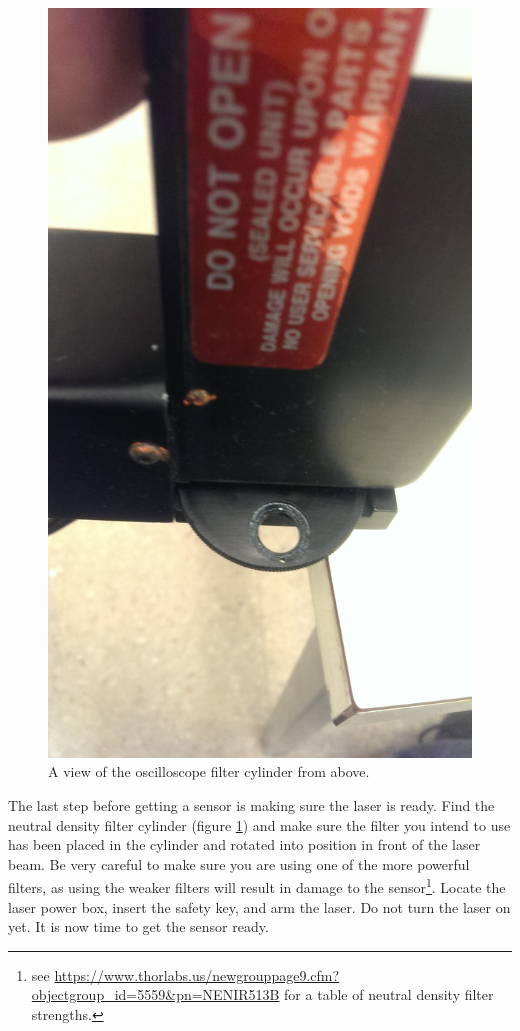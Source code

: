 \documentclass{report}
\begin{document}
            \begin{figure}[h] 
                \includegraphics[height=.4\textheight]{laser_00}
                \centering
                \caption{ A view of the oscilloscope filter cylinder from above. }
                \label{fig:laser_00}
            \end{figure}

            The last step before getting a sensor is making sure the laser is ready. Find the neutral density filter cylinder (figure \ref{fig:laser_00}) and make sure the filter you intend to use has been placed in the cylinder and rotated into position in front of the laser beam. Be very careful to make sure you are using one of the more powerful filters, as using the weaker filters will result in damage to the sensor\footnote{see \url{https://www.thorlabs.us/newgrouppage9.cfm?objectgroup\_id=5559&pn=NENIR513B} for a table of neutral density filter strengths.}. Locate the laser power box, insert the safety key, and arm the laser. Do not turn the laser on yet. It is now time to get the sensor ready.
\end{document}
